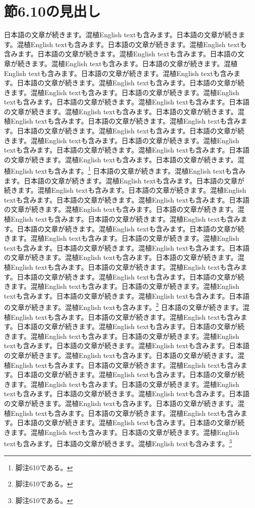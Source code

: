 \documentclass[pdflatex,book]{jlreq}
\begin{document}
\section{節6.10の見出し}
日本語の文章が続きます。混植English textも含みます。日本語の文章が続きます。混植English textも含みます。日本語の文章が続きます。混植English textも含みます。日本語の文章が続きます。混植English textも含みます。日本語の文章が続きます。混植English textも含みます。日本語の文章が続きます。混植English textも含みます。日本語の文章が続きます。混植English textも含みます。日本語の文章が続きます。混植English textも含みます。日本語の文章が続きます。混植English textも含みます。日本語の文章が続きます。混植English textも含みます。日本語の文章が続きます。混植English textも含みます。日本語の文章が続きます。混植English textも含みます。日本語の文章が続きます。混植English textも含みます。日本語の文章が続きます。混植English textも含みます。日本語の文章が続きます。混植English textも含みます。日本語の文章が続きます。混植English textも含みます。日本語の文章が続きます。混植English textも含みます。日本語の文章が続きます。混植English textも含みます。日本語の文章が続きます。混植English textも含みます。日本語の文章が続きます。混植English textも含みます。\footnote{脚注610である。}
日本語の文章が続きます。混植English textも含みます。日本語の文章が続きます。混植English textも含みます。日本語の文章が続きます。混植English textも含みます。日本語の文章が続きます。混植English textも含みます。日本語の文章が続きます。混植English textも含みます。日本語の文章が続きます。混植English textも含みます。日本語の文章が続きます。混植English textも含みます。日本語の文章が続きます。混植English textも含みます。日本語の文章が続きます。混植English textも含みます。日本語の文章が続きます。混植English textも含みます。日本語の文章が続きます。混植English textも含みます。日本語の文章が続きます。混植English textも含みます。日本語の文章が続きます。混植English textも含みます。日本語の文章が続きます。混植English textも含みます。日本語の文章が続きます。混植English textも含みます。日本語の文章が続きます。混植English textも含みます。日本語の文章が続きます。混植English textも含みます。日本語の文章が続きます。混植English textも含みます。日本語の文章が続きます。混植English textも含みます。日本語の文章が続きます。混植English textも含みます。\footnote{脚注610である。}
日本語の文章が続きます。混植English textも含みます。日本語の文章が続きます。混植English textも含みます。日本語の文章が続きます。混植English textも含みます。日本語の文章が続きます。混植English textも含みます。日本語の文章が続きます。混植English textも含みます。日本語の文章が続きます。混植English textも含みます。日本語の文章が続きます。混植English textも含みます。日本語の文章が続きます。混植English textも含みます。日本語の文章が続きます。混植English textも含みます。日本語の文章が続きます。混植English textも含みます。日本語の文章が続きます。混植English textも含みます。日本語の文章が続きます。混植English textも含みます。日本語の文章が続きます。混植English textも含みます。日本語の文章が続きます。混植English textも含みます。日本語の文章が続きます。混植English textも含みます。日本語の文章が続きます。混植English textも含みます。日本語の文章が続きます。混植English textも含みます。日本語の文章が続きます。混植English textも含みます。日本語の文章が続きます。混植English textも含みます。日本語の文章が続きます。混植English textも含みます。\footnote{脚注610である。}
\end{document}
